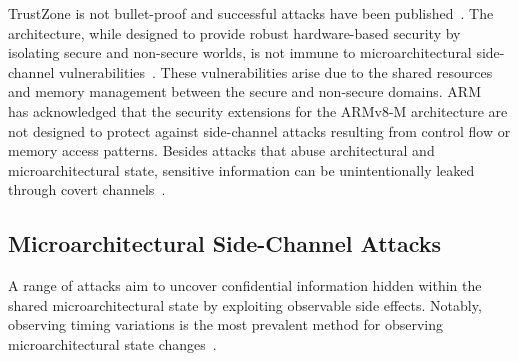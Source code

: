 TrustZone is not bullet-proof and successful attacks have been
published~\cite{DemystifyingAT, surveyonTEE,
returntononsecure}. The architecture, while designed to provide robust
hardware-based security by isolating secure and non-secure worlds, is not
immune to microarchitectural side-channel
vulnerabilities~\cite{DemystifyingAT, busted, surveyonTEE, truspy,
Bypassed}. These vulnerabilities arise due to the shared resources and
memory management between the secure and non-secure domains.
ARM~\cite{armdeveloper} has acknowledged that the security extensions for
the ARMv8-M architecture are not designed to protect against side-channel
attacks resulting from control flow or memory access patterns.
Besides attacks that abuse architectural and microarchitectural state,
sensitive information can be unintentionally leaked through covert
channels~\cite{storagechannel, sabelfeld}.

\subsection{Microarchitectural Side-Channel Attacks}

A range of attacks aim to uncover confidential information hidden within
the shared microarchitectural state by
exploiting observable side effects. Notably, observing timing variations
is the most prevalent method for observing microarchitectural state
changes~\cite{vanbulckphdthesis}.


